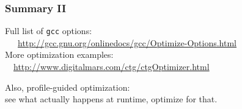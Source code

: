 \documentclass[aspectratio=43]{beamer}
\newenvironment{changemargin}[1]{%
  \begin{list}{}{%
    \setlength{\topsep}{0pt}%
    \setlength{\leftmargin}{#1}%
    \setlength{\rightmargin}{1em}
    \setlength{\listparindent}{\parindent}%
    \setlength{\itemindent}{\parindent}%
    \setlength{\parsep}{\parskip}%
  }%
  \item[]}{\end{list}}
\begin{document}
\begin{frame}
  \frametitle{Summary II}

  \begin{changemargin}{0.5cm}
     Full list of {\tt gcc} options: \\ ~~~{\small \url{http://gcc.gnu.org/onlinedocs/gcc/Optimize-Options.html}}\\
      More optimization examples: \\ ~~\url{http://www.digitalmars.com/ctg/ctgOptimizer.html}\\[1em]
  \end{changemargin}
  \begin{changemargin}{1.5cm}

     Also, profile-guided optimization:\\
\qquad see what actually happens at runtime, optimize for that.
  \end{changemargin}
\end{frame}
\end{document}
